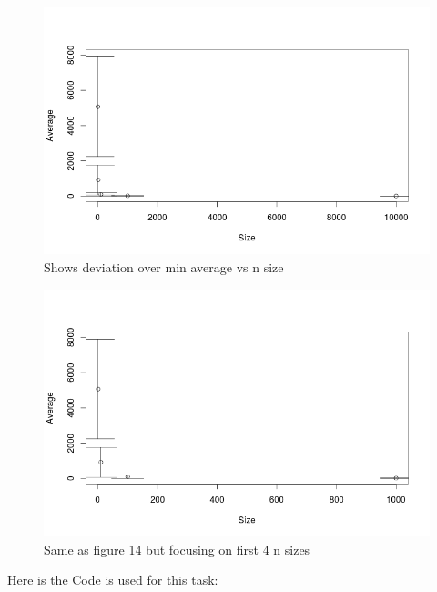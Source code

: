 \documentclass{article}
\begin{document}
	\begin{figure}[H]
		\begin{center}
			\includegraphics[scale=0.7]{plotminall.png}
		\end{center}
		\caption{Shows deviation over min average vs n size}
	\end{figure}
	\begin{figure}[H]
		\begin{center}
			\includegraphics[scale=0.7]{plotmin4.png}
		\end{center}
		\caption{Same as figure 14 but focusing on first 4 n sizes}
	\end{figure}
	Here is the Code is used for this task:\\
\end{document}

